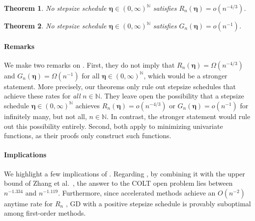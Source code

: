 \documentclass[11pt]{article}
\newcommand{\N}{\mathbb{N}}
\newcommand{\schedule}{\bm{\eta}}
\newtheorem{theorem}{Theorem}[section]
\begin{document}
\begin{theorem}\label{thm:function_value_impossibility}
No stepsize schedule $\schedule\in(0,\infty)^{\N}$ satisfies $R_n(\schedule)=o(n^{-4/3})$.
\end{theorem}

\begin{theorem}\label{thm:gradient_norm_impossibility}
No stepsize schedule $\schedule\in(0,\infty)^{\N}$ satisfies $G_n(\schedule)=o(n^{-1})$.
\end{theorem}

\paragraph{Remarks}
We make two remarks on .
First, they do not imply that $R_n(\schedule)=\Omega(n^{-4/3})$ and $G_n(\schedule)=\Omega(n^{-1})$ for all $\schedule\in(0,\infty)^{\N}$, which would be a stronger statement.
More precisely, our theorems only rule out stepsize schedules that achieve these rates for \emph{all} $n\in\N$.
They leave open the possibility that a stepsize schedule $\schedule\in(0,\infty)^{\N}$ achieves $R_n(\schedule)=o(n^{-4/3})$ or $G_n(\schedule)=o(n^{-1})$ for infinitely many, but not all, $n\in\N$.
In contrast, the stronger statement would rule out this possibility entirely.
Second, both  apply to minimizing univariate functions, as their proofs only construct such functions.


\paragraph{Implications}
We highlight a few implications of .
Regarding , by combining it with the upper bound of Zhang et al.~\cite{zhang:2025}, the answer to the COLT open problem \cite{kornowski:2024} lies between $n^{-1.334}$ and $n^{-1.119}$.
Furthermore, since accelerated methods achieve an $O(n^{-2})$ anytime rate for $R_n$ \cite{nesterov:1983}, 
GD with a positive stepsize schedule is provably suboptimal among first-order methods.
\end{document}
